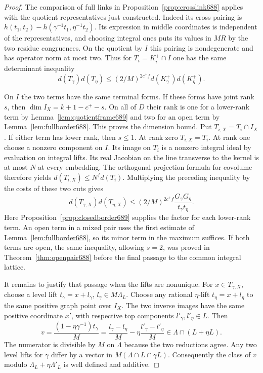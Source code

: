 \documentclass[a4paper,11pt]{article}
\theoremstyle{definition}
\theoremstyle{remark}
\numberwithin{equation}{section}
\begin{document}
\begin{proof}
The comparison of full links in Proposition~\ref{prop:crosslink688}
applies with the quotient representatives just constructed.
Indeed its cross pairing is
\(h(t_1,t_2)-h(\gamma^{-1}t_1,\eta^{-1}t_2)\). Its expression
in middle coordinates is independent of the representatives,
and choosing integral ones puts its values in \(MR\) by the
two residue congruences. On the quotient by \(I\) this pairing
is nondegenerate and has operator norm at most two. Thus for
\(T_i=K_i^+\cap I\) one has the same determinant inequality
\[
 d(T_\gamma)d(T_\eta)\le(2/M)^{2c^+ f}
                                     d(K_\gamma^+)d(K_\eta^+).
\]

On \(I\) the two terms have the same terminal forms. If these
forms have joint rank \(s\), then
\(\dim I_X=k+1-c^+-s\). On all of \(D\) their rank is one
for a lower-rank term by Lemma~\ref{lem:quotientframe689}
and two for an open term by Lemma~\ref{lem:fullborder688}.
This proves the dimension bound. Put \(T_{i,X}=T_i\cap I_X\).
If either term has lower rank, then \(s\le1\). At rank zero
\(T_{i,X}=T_i\). At rank one choose a nonzero component on \(I\).
Its image on \(T_i\) is a nonzero integral ideal by evaluation
on integral lifts. Its real Jacobian on the line transverse to
the kernel is at most \(N\) at every embedding. The orthogonal
projection formula for covolume therefore yields
\(d(T_{i,X})\le N^f d(T_i)\). Multiplying the preceding
inequality by the costs of these two cuts gives
\[
       d(T_{\gamma,X})d(T_{\eta,X})
       \le (2/M)^{2c^+ f}\frac{G_\gamma G_\eta}{t_\gamma t_\eta}.
\]
Here Proposition~\ref{prop:closedborder689} supplies the
factor for each lower-rank term. An open term in a mixed pair
uses the first estimate of Lemma~\ref{lem:fullborder688},
so its minor term in the maximum suffices. If both terms
are open, the same inequality, allowing \(s=2\), was proved
in Theorem~\ref{thm:openpair688} before the final passage
to the common integral lattice.

It remains to justify that passage when the lifts are
nonunique. For \(x\in T_{\gamma,X}\), choose a level lift
\(t_\gamma=x+l_\gamma\), \(l_\gamma\in M\Lambda_L\). Choose
any rational \(\eta\)-lift \(t_\eta=x+l_\eta\) to the same
positive graph point over \(I_X\). The two inverse images
have the same positive coordinate \(x'\), with respective
top components \(l'_\gamma,l'_\eta\in L\). Then
\[
 v=\frac{(1-\eta\gamma^{-1})t_\gamma}{M}
   =\frac{l_\gamma-l_\eta}{M}
      -\eta\frac{l'_\gamma-l'_\eta}{M}
        \in\Lambda\cap(L+\eta L).
\]
The numerator is divisible by \(M\) on \(\Lambda\) because
the two reductions agree. Any two level lifts for \(\gamma\)
differ by a vector in \(M(\Lambda\cap L\cap\gamma L)\).
Consequently the class of \(v\) modulo
\(\Lambda_L+\eta\Lambda'_L\) is well defined and additive.


\end{proof}
\end{document}
